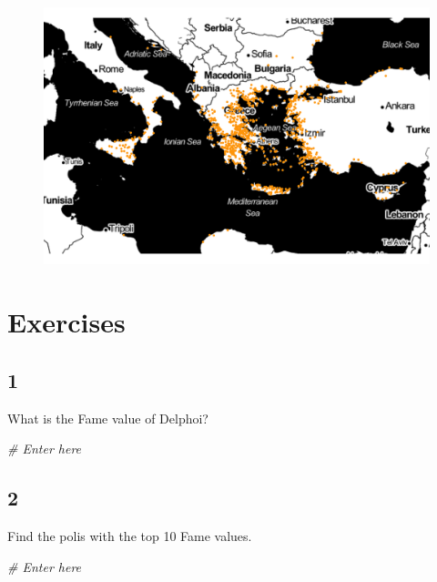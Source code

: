 \documentclass[]{book}
\newenvironment{Shaded}{\begin{snugshade}}{\end{snugshade}}
\newcommand{\CommentTok}[1]{\textcolor[rgb]{0.56,0.35,0.01}{\textit{#1}}}
\theoremstyle{definition}
\theoremstyle{definition}
\theoremstyle{definition}
\theoremstyle{remark}
\begin{document}
\begin{figure}
\centering
\includegraphics{images/ober_ggmap_polis.png}
\caption{}
\end{figure}

\section*{Exercises}\label{exercises}

\subsection*{1}\label{section}

What is the Fame value of Delphoi?

\begin{Shaded}
\begin{Highlighting}[]
\CommentTok{# Enter here}
\end{Highlighting}
\end{Shaded}

\subsection*{2}\label{section-1}

Find the polis with the top 10 Fame values.

\begin{Shaded}
\begin{Highlighting}[]
\CommentTok{# Enter here}
\end{Highlighting}
\end{Shaded}
\end{document}
